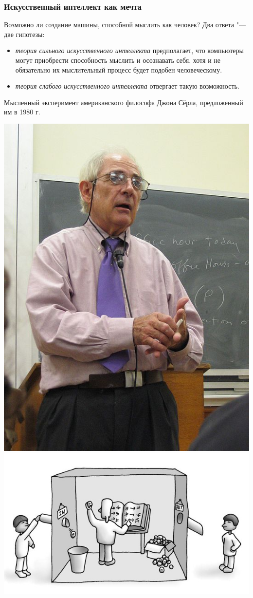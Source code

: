 \documentclass[default]{beamer}
\begin{document}
	\begin{frame}
		\frametitle{Искусственный интеллект как мечта}
		\footnotesize
		Возможно ли создание машины, способной мыслить как человек?	Два ответа "--- две гипотезы:
		\begin{itemize}
			\item \textit{теория сильного искусственного интеллекта} предполагает, что компьютеры могут приобрести способность мыслить и осознавать себя, хотя и не обязательно их мыслительный процесс будет подобен человеческому.
			\item \textit{теория слабого искусственного интеллекта} отвергает такую возможность.
		\end{itemize}
		Мысленный эксперимент американского философа Джона Сёрла, предложенный им в 1980 г.
		\begin{center}
			\includegraphics[height=0.4\textheight]{searle.jpg}\quad
			\includegraphics[height=0.4\textheight]{china_room.jpg}

\end{center}
\end{frame}
\end{document}
